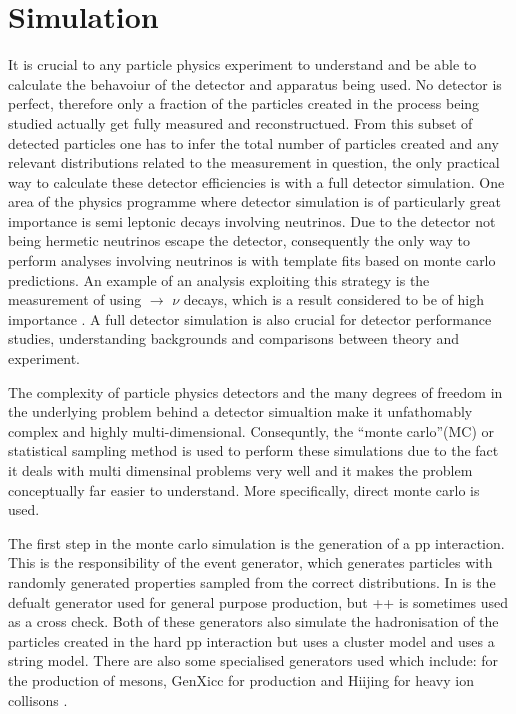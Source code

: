 
\section{Simulation}
\setcounter{secnumdepth}{5}
\label{sec:Simulation}
It is crucial to any particle physics experiment to understand and be able to calculate the behavoiur of the detector and apparatus being used.  No detector is perfect, therefore only a fraction of the particles created in the process being studied actually get fully measured and reconstructued.  From this subset of detected particles one has to infer the total number of particles created and any relevant distributions related to the measurement in question, the only practical way to calculate these detector efficiencies is with a full detector simulation.  One area of the \lhcb physics programme where detector simulation is of particularly great importance is semi leptonic decays involving neutrinos.  Due to the \lhcb detector not being hermetic neutrinos escape the detector, consequently the only way to perform analyses involving neutrinos is with template fits based on monte carlo predictions.  An example of an analysis exploiting this strategy is the measurement of \Vub using \Lb $\rightarrow$ \proton \muon $\nu$ decays, which is a result considered to be of high importance \cite{LHCb-PAPER-2015-013}.  A full detector simulation is also crucial for detector performance studies, understanding backgrounds and comparisons between theory and experiment.

The complexity of particle physics detectors and the many degrees of freedom in the underlying problem behind a detector simualtion make it unfathomably complex and highly multi-dimensional.  Consequntly, the ``monte carlo''(MC) or statistical sampling method is used to perform these simulations due to the fact it deals with multi dimensinal problems very well and it makes the problem conceptually far easier to understand.  More specifically, direct monte carlo is used.

The first step in the monte carlo simulation is the generation of a pp interaction.  This is the responsibility of the event generator, which generates particles with randomly generated properties sampled from the correct distributions.  In \lhcb \pythia is the defualt generator used for general purpose production, but \herwig++ is sometimes used as a cross check\cite{Sjostrand:2007gs,Herwig}.  Both of these generators also simulate the hadronisation of the particles created in the hard pp interaction but \herwig uses a cluster model and \pythia uses a string model.  There are also some specialised generators used which include: \bcvegpy for the production of \Bc mesons, GenXicc for \Xic production and Hiijing for heavy ion collisons \cite{bcvegpy,Gyulassy:1994ew,Chang:2007pp}.

